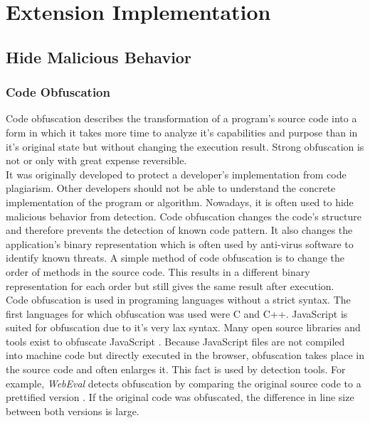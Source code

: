 
\section{Extension Implementation} %

	\subsection{Hide Malicious Behavior} %
	
		
	
		
		
		
		
		\subsubsection{Code Obfuscation}
			
			Code obfuscation describes the transformation of a program's source code into a form in which it takes more time to analyze it's capabilities and purpose than in it's original state but without changing the execution result. Strong obfuscation is not or only with great expense reversible. \\
			
			It was originally developed to protect a developer's implementation from code plagiarism. Other developers should not be able to understand the concrete implementation of the program or algorithm. Nowadays, it is often used to hide malicious behavior from detection. Code obfuscation changes the code's structure and therefore prevents the detection of known code pattern. It also changes the application's binary representation which is often used by anti-virus software to identify known threats. A simple method of code obfuscation is to change the order of methods in the source code. This results in a different binary representation for each order but still gives the same result after execution. \\
			
			Code obfuscation is used in programing languages without a strict syntax. The first languages for which obfuscation was used were C and C++. JavaScript is suited for obfuscation due to it's very lax syntax. Many open source libraries and tools exist to obfuscate JavaScript \cite{obfuscationDansTools, obfuscationJavascriptObfuscator, obfuscationJscrambler}. Because JavaScript files are not compiled into machine code but directly executed in the browser, obfuscation takes place in the source code and often enlarges it. This fact is used by detection tools. For example, \textit{WebEval} detects obfuscation by comparing the original source code to a prettified version \cite{190984}. If the original code was obfuscated, the difference in line size between both versions is large. \\
		
